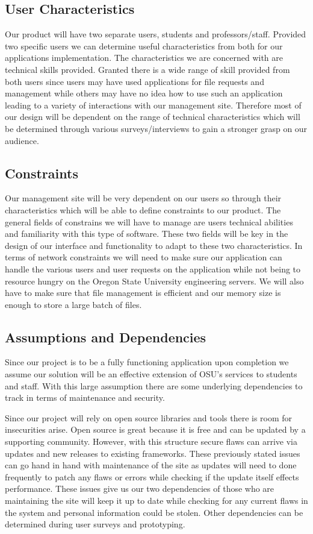 \documentclass[onecolumn, draftclsnofoot,10pt, compsoc]{IEEEtran}
\begin{document}
\subsection{User Characteristics}
Our product will have two separate users, students and professors/staff. Provided two specific users we can determine useful characteristics from both for our applications implementation. The characteristics we are concerned with are technical skills provided. Granted there is a wide range of skill provided from both users since users may have used applications for file requests and management while others may have no idea how to use such an application leading to a variety of interactions with our management site. Therefore most of our design will be dependent on the range of technical characteristics which will be determined through various surveys/interviews to gain a stronger grasp on our audience. 

\subsection{Constraints}
Our management site will be very dependent on our users so through their characteristics which will be able to define constraints to our product. The general fields of constrains we will have to manage are users technical abilities and familiarity with this type of software. These two fields will be key in the design of our interface and functionality to adapt to these two characteristics. In terms of network constraints we will need to make sure our application can handle the various users and user requests on the application while not being to resource hungry on the Oregon State University engineering servers. We will also have to make sure that file management is efficient and our memory size is enough to store a large batch of files. 

\subsection{Assumptions and Dependencies}
Since our project is to be a fully functioning application upon completion we assume our solution will be an effective extension of OSU's services to students and staff. With this large assumption there are some underlying dependencies to track in terms of maintenance and security. 

Since our project will rely on open source libraries and tools there is room for insecurities arise. Open source is great because it is free and can be updated by a supporting community. However, with this structure secure flaws can arrive via updates and new releases to existing frameworks. These previously stated issues can go hand in hand with maintenance of the site as updates will need to done frequently to patch any flaws or errors while checking if the update itself effects performance. These issues give us our two dependencies of those who are maintaining the site will keep it up to date while checking for any current flaws in the system and personal information could be stolen. Other dependencies can be determined during user surveys and prototyping. 
\end{document}
